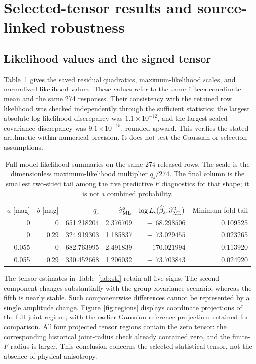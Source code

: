 \section{Selected-tensor results and source-linked robustness}
\label{sec:results}

\subsection{Likelihood values and the signed tensor}

Table~\ref{tab:likelihood} gives the saved residual quadratics, maximum-likelihood scales, and normalized likelihood values. These values refer to the same fifteen-coordinate mean and the same 274 responses. Their consistency with the retained row likelihood was checked independently through the sufficient statistics: the largest absolute log-likelihood discrepancy was $1.1\times10^{-12}$, and the largest scaled covariance discrepancy was $9.1\times10^{-15}$, rounded upward. This verifies the stated arithmetic within numerical precision. It does not test the Gaussian or selection assumptions.

\begin{table}[htb]
\caption{Full-model likelihood summaries on the same 274 released rows. The scale is the dimensionless maximum-likelihood multiplier $q_s/274$. The final column is the smallest two-sided tail among the five predictive $F$ diagnostics for that shape; it is not a combined probability.}
\label{tab:likelihood}
\begin{ruledtabular}
\begin{tabular}{rrrrrr}
$a$ [mag]&$b$ [mag]&$q_s$&$\widehat\sigma^2_{\rm ML}$&$\log L_s(\widehat\beta_s,\widehat\sigma^2_{\rm ML})$&Minimum fold tail\\
0&0&651.218204&2.376709&$-168.298506$&0.109525\\
0&0.29&324.919303&1.185837&$-173.029455$&0.023265\\
0.055&0&682.763995&2.491839&$-170.021994$&0.113920\\
0.055&0.29&330.452668&1.206032&$-173.703843$&0.024920
\end{tabular}
\end{ruledtabular}
\end{table}

The tensor estimates in Table~\ref{tab:stf} retain all five signs. The second component changes substantially with the group-covariance scenario, whereas the fifth is nearly stable. Such componentwise differences cannot be represented by a single amplitude change. Figure~\ref{fig:regions} displays coordinate projections of the full joint regions, with the earlier Gaussian-reference projections retained for comparison. All four projected tensor regions contain the zero tensor: the corresponding historical joint-radius check already contained zero, and the finite-$F$ radius is larger. This conclusion concerns the selected statistical tensor, not the absence of physical anisotropy.

